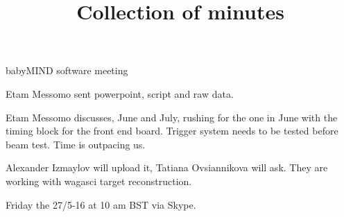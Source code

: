 \documentclass{article}
\title{Collection of minutes}
\author{\LaTeXe}
\begin{document}
\begin{Minutes}{babyMIND software meeting}

\maketitle

Etam Messomo sent powerpoint, script and raw data.

Etam Messomo discusses, June and July, rushing for the one in June with the timing block for the front end board. 
Trigger system needs to be tested before beam test. Time is outpacing us. 

Alexander Izmaylov will upload it, Tatiana Ovsiannikova will ask.
They are working with wagasci target reconstruction.

Friday the 27/5-16 at 10 am BST via Skype.

\end{Minutes}
\end{document}
